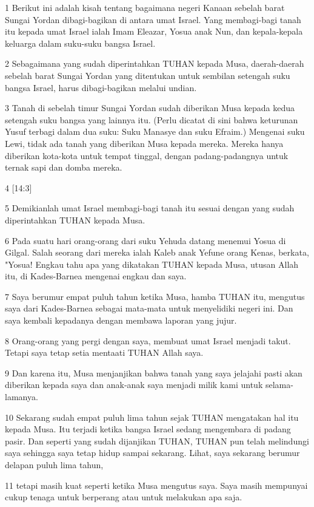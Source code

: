 \par 1 Berikut ini adalah kisah tentang bagaimana negeri Kanaan sebelah barat Sungai Yordan dibagi-bagikan di antara umat Israel. Yang membagi-bagi tanah itu kepada umat Israel ialah Imam Eleazar, Yosua anak Nun, dan kepala-kepala keluarga dalam suku-suku bangsa Israel.
\par 2 Sebagaimana yang sudah diperintahkan TUHAN kepada Musa, daerah-daerah sebelah barat Sungai Yordan yang ditentukan untuk sembilan setengah suku bangsa Israel, harus dibagi-bagikan melalui undian.
\par 3 Tanah di sebelah timur Sungai Yordan sudah diberikan Musa kepada kedua setengah suku bangsa yang lainnya itu. (Perlu dicatat di sini bahwa keturunan Yusuf terbagi dalam dua suku: Suku Manasye dan suku Efraim.) Mengenai suku Lewi, tidak ada tanah yang diberikan Musa kepada mereka. Mereka hanya diberikan kota-kota untuk tempat tinggal, dengan padang-padangnya untuk ternak sapi dan domba mereka.
\par 4 [14:3]
\par 5 Demikianlah umat Israel membagi-bagi tanah itu sesuai dengan yang sudah diperintahkan TUHAN kepada Musa.
\par 6 Pada suatu hari orang-orang dari suku Yehuda datang menemui Yosua di Gilgal. Salah seorang dari mereka ialah Kaleb anak Yefune orang Kenas, berkata, "Yosua! Engkau tahu apa yang dikatakan TUHAN kepada Musa, utusan Allah itu, di Kades-Barnea mengenai engkau dan saya.
\par 7 Saya berumur empat puluh tahun ketika Musa, hamba TUHAN itu, mengutus saya dari Kades-Barnea sebagai mata-mata untuk menyelidiki negeri ini. Dan saya kembali kepadanya dengan membawa laporan yang jujur.
\par 8 Orang-orang yang pergi dengan saya, membuat umat Israel menjadi takut. Tetapi saya tetap setia mentaati TUHAN Allah saya.
\par 9 Dan karena itu, Musa menjanjikan bahwa tanah yang saya jelajahi pasti akan diberikan kepada saya dan anak-anak saya menjadi milik kami untuk selama-lamanya.
\par 10 Sekarang sudah empat puluh lima tahun sejak TUHAN mengatakan hal itu kepada Musa. Itu terjadi ketika bangsa Israel sedang mengembara di padang pasir. Dan seperti yang sudah dijanjikan TUHAN, TUHAN pun telah melindungi saya sehingga saya tetap hidup sampai sekarang. Lihat, saya sekarang berumur delapan puluh lima tahun,
\par 11 tetapi masih kuat seperti ketika Musa mengutus saya. Saya masih mempunyai cukup tenaga untuk berperang atau untuk melakukan apa saja.
